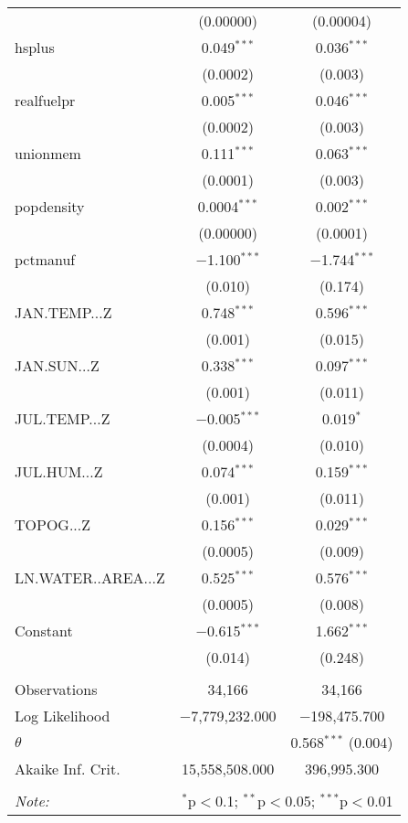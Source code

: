 \begin{table}[!htbp]
\begin{tabular}{@{\extracolsep{5pt}}lcc}
  & (0.00000) & (0.00004) \\ 
  hsplus & 0.049$^{***}$ & 0.036$^{***}$ \\ 
  & (0.0002) & (0.003) \\ 
  realfuelpr & 0.005$^{***}$ & 0.046$^{***}$ \\ 
  & (0.0002) & (0.003) \\ 
  unionmem & 0.111$^{***}$ & 0.063$^{***}$ \\ 
  & (0.0001) & (0.003) \\ 
  popdensity & 0.0004$^{***}$ & 0.002$^{***}$ \\ 
  & (0.00000) & (0.0001) \\ 
  pctmanuf & $-$1.100$^{***}$ & $-$1.744$^{***}$ \\ 
  & (0.010) & (0.174) \\ 
  JAN.TEMP...Z & 0.748$^{***}$ & 0.596$^{***}$ \\ 
  & (0.001) & (0.015) \\ 
  JAN.SUN...Z & 0.338$^{***}$ & 0.097$^{***}$ \\ 
  & (0.001) & (0.011) \\ 
  JUL.TEMP...Z & $-$0.005$^{***}$ & 0.019$^{*}$ \\ 
  & (0.0004) & (0.010) \\ 
  JUL.HUM...Z & 0.074$^{***}$ & 0.159$^{***}$ \\ 
  & (0.001) & (0.011) \\ 
  TOPOG...Z & 0.156$^{***}$ & 0.029$^{***}$ \\ 
  & (0.0005) & (0.009) \\ 
  LN.WATER..AREA...Z & 0.525$^{***}$ & 0.576$^{***}$ \\ 
  & (0.0005) & (0.008) \\ 
  Constant & $-$0.615$^{***}$ & 1.662$^{***}$ \\ 
  & (0.014) & (0.248) \\ 
 \hline \\[-1.8ex] 
Observations & 34,166 & 34,166 \\ 
Log Likelihood & $-$7,779,232.000 & $-$198,475.700 \\ 
$\theta$ &  & 0.568$^{***}$  (0.004) \\ 
Akaike Inf. Crit. & 15,558,508.000 & 396,995.300 \\ 
\hline 
\hline \\[-1.8ex] 
\textit{Note:}  & \multicolumn{2}{r}{$^{*}$p$<$0.1; $^{**}$p$<$0.05; $^{***}$p$<$0.01} \\ 
\end{tabular} 
\end{table} 
